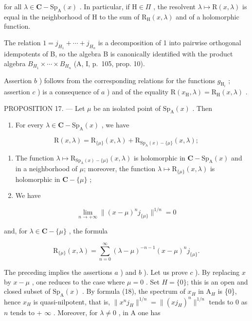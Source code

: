 for all \(\lambda\in\mathbf{C}-\mathrm{Sp}_{\mathrm{A}}(x)\) . In particular, if \(\mathrm{H}\in\Pi\) , the resolvent \(\lambda\mapsto\mathrm{R}(x,\lambda)\) is equal in the neighborhood of \(\mathrm{H}\) to the sum of \(\mathrm{R}_{\mathrm{H}}(x,\lambda)\) and of a holomorphic function.

The relation \(1 = j_{H_{1}} + \cdots + j_{H_{n}}\) is a decomposition of 1 into pairwise orthogonal idempotents of B, so the algebra B is canonically identified with the product algebra \(B_{H_{1}} \times \cdots \times B_{H_{n}}\) (A, I, p.~105, prop. 10).

Assertion \(b\) ) follows from the corresponding relations for the functions \(g_{\mathrm{H}_i}\) ; assertion \(c\) ) is a consequence of \(a\) ) and of the equality \(\mathrm{R}(x_{\mathrm{H}},\lambda) = \mathrm{R}_{\mathrm{H}}(x,\lambda)\) .

PROPOSITION 17. --- Let \(\mu\) be an isolated point of \(\mathrm{Sp}_{\mathrm{A}}(x)\) . Then

\begin{enumerate}
\def\labelenumi{\alph{enumi})}
\tightlist
\item
  For every \(\lambda \in \mathbf{C} - \mathrm{Sp}_{\mathrm{A}}(x)\) , we have
\end{enumerate}

\[
\mathrm{R} (x, \lambda) = \mathrm{R} _ {\{\mu \}} (x, \lambda) + \mathrm{R} _ {\mathrm{Sp} _ {\mathrm{A}} (x) - \{\mu \}} (x, \lambda);
\]

\begin{enumerate}
\def\labelenumi{\alph{enumi})}
\setcounter{enumi}{1}
\item
  The function \(\lambda \mapsto \mathrm{R}_{\mathrm{Sp}_{\mathrm{A}}(x)-\{\mu\}}(x,\lambda)\) is holomorphic in \(\mathbf{C}-\mathrm{Sp}_{\mathrm{A}}(x)\) and in a neighborhood of \(\mu\); moreover, the function \(\lambda \mapsto \mathrm{R}_{\{\mu\}}(x,\lambda)\) is holomorphic in \(\mathbf{C}-\{\mu\}\) ;
\item
  We have
\end{enumerate}

\[
\lim _ {n \to + \infty} \| (x - \mu) ^ {n} j _ {\{\mu \}} \| ^ {1 / n} = 0
\]

and, for \(\lambda \in \mathbf{C} - \{\mu\}\) , the formula

\[
\mathrm{R} _ {\{\mu \}} (x, \lambda) = \sum_ {n = 0} ^ {\infty} (\lambda - \mu) ^ {- n - 1} (x - \mu) ^ {n} j _ {\{\mu \}}.\tag{20}
\]

The preceding implies the assertions \(a\) ) and \(b\) ). Let us prove \(c\) ). By replacing \(x\) by \(x-\mu\) , one reduces to the case where \(\mu=0\) . Set \(H = \{0\}\); this is an open and closed subset of \(\mathrm{Sp}_{\mathrm{A}}(x)\) . By formula (18), the spectrum of \(x_{H}\) in \(\mathrm{A}_{H}\) is \{0\}, hence \(x_{H}\) is quasi-nilpotent, that is, \(\|x^{n}j_{H}\|^{1/n}=\|(xj_{H})^{n}\|^{1/n}\) tends to 0 as \(n\) tends to + \(\infty\) . Moreover, for \(\lambda\neq0\) , in A one has

